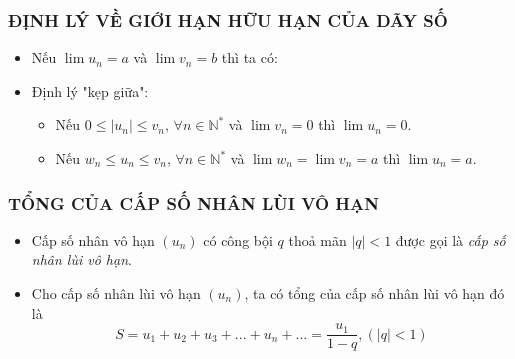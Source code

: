 \subsubsection{ĐỊNH LÝ VỀ GIỚI HẠN HỮU HẠN CỦA DÃY SỐ}
\begin{itemize}
	\item [\iconMT] Nếu $\lim u_n=a$ và $\lim v_n=b$ thì ta có:
	\begin{gachsoc}
		\begin{itemize}
		\end{itemize}
	\end{gachsoc}
	\item [\iconMT] Định lý "kẹp giữa":
	\begin{gachsoc}
		\begin{itemize}
			\item Nếu $0\le \left|u_n\right|\le v_n$, $\forall n\in \mathbb{N}^*$ và $\lim v_n=0$ thì $\lim u_n=0$.
			\item Nếu $w_n\le u_n\le v_n$, $\forall n\in \mathbb{N}^*$ và $\lim w_n=\lim v_n=a$ thì $\lim u_n=a$.
		\end{itemize}
	\end{gachsoc}
\end{itemize}

\subsubsection{TỔNG CỦA CẤP SỐ NHÂN LÙI VÔ HẠN}
\begin{itemize}
	\item [\iconMT] Cấp số nhân vô hạn $(u_n)$ có công bội $q$ thoả mãn $|q|<1$ được gọi là \textit{cấp số nhân lùi vô hạn}.
	\item [\iconMT] Cho cấp số nhân lùi vô hạn $(u_n)$, ta có tổng của cấp số nhân lùi vô hạn đó là $$S=u_1+u_2+u_3+...+u_n+...=\dfrac{u_1}{1-q}, (|q|<1)$$
\end{itemize}

